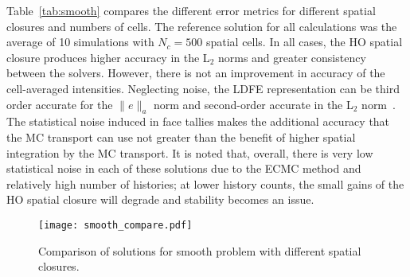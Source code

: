 Table~\ref{tab:smooth} compares the different error metrics for different spatial
closures and numbers of cells.  The reference solution for all calculations was the average of 10 simulations with $N_c=500$ spatial
cells.  In all cases, the HO spatial closure produces higher accuracy in the L$_2$
norms and greater consistency between the solvers.  However, there is not an
improvement in accuracy of the cell-averaged intensities.  Neglecting noise, the LDFE representation can be third order
accurate for the $\|e\|_a$ norm and second-order accurate in the L$_2$ norm~\cite{morel_ldtrt}. 
The statistical noise induced in face tallies makes the
additional accuracy that the MC transport can use not greater than the benefit of
higher spatial integration by the MC transport.  It
is noted that, overall, there is very low statistical noise in each of these
solutions due to the ECMC method and relatively high number of histories; at lower
history counts, the small gains of the HO spatial closure will degrade and stability
becomes an issue.

\begin{figure}[H]
    \centering
    \texttt{[image: smooth\_compare.pdf]}
    \caption{\label{fig:smooth_compare} Comparison of solutions for smooth problem with different spatial closures.}
\end{figure}

